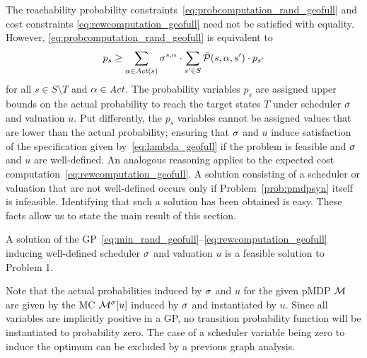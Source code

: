The reachability probability constraints~\eqref{eq:probcomputation_rand_geofull} and cost constraints \eqref{eq:rewcomputation_geofull} need not be satisfied with equality. However, \eqref{eq:probcomputation_rand_geofull} is equivalent to 
\begin{align*}
	{p_s} \geq {\sum\limits_{\ensuremath{\alpha}\in\ensuremath{\mathit{Act}}(s)}\sigma^{s,\ensuremath{\alpha}}\cdot\sum\limits_{s'\in S} \bar{\mathcal{P}}(s,\ensuremath{\alpha},s')\cdot p_{s'}}
\end{align*}
for all $s\in S\setminus T$ and $\alpha\in \mathit{Act}$.
The probability variables $p_s$ are assigned upper bounds on the actual probability to reach the target states $T$ under scheduler $\sigma$ and valuation $u$. Put differently, the $p_s$ variables cannot be assigned values that are lower than the actual probability; ensuring that $\sigma$ and $u$ induce satisfaction of the specification given by~\eqref{eq:lambda_geofull} if the problem is feasible and $\sigma$ and $u$ are well-defined. An analogous reasoning applies to the expected cost computation~\eqref{eq:rewcomputation_geofull}. 
A solution consisting of a scheduler or valuation that are not well-defined occurs only if Problem~\ref{prob:pmdpsyn} itself is infeasible. Identifying that such a solution has been obtained is easy.
These facts allow us to state the main result of this section.
\begin{theorem}
	\label{thm:main}
	A solution of the GP~\eqref{eq:min_rand_geofull}--\eqref{eq:rewcomputation_geofull} inducing well-defined scheduler $\sigma$ and valuation $u$ is a feasible solution to Problem 1.
\end{theorem}
Note that the actual probabilities induced by $\sigma$ and $u$ for the given pMDP $\mathcal{M}$ are given by the MC $\mathcal{M}^{\sigma}[u]$ induced by $\sigma$ and instantiated by $u$.
Since all variables are implicitly positive in a GP, no transition probability function will be instantiated to probability zero. 
The case of a scheduler variable being zero to induce the optimum can be excluded by a previous graph analysis.
%






